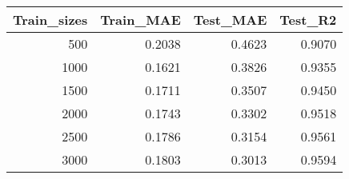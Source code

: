 \begin{tabular}{rrrr}
\toprule
Train_sizes & Train_MAE & Test_MAE & Test_R2 \\
\midrule
500 & 0.2038 & 0.4623 & 0.9070 \\
1000 & 0.1621 & 0.3826 & 0.9355 \\
1500 & 0.1711 & 0.3507 & 0.9450 \\
2000 & 0.1743 & 0.3302 & 0.9518 \\
2500 & 0.1786 & 0.3154 & 0.9561 \\
3000 & 0.1803 & 0.3013 & 0.9594 \\
\bottomrule
\end{tabular}
